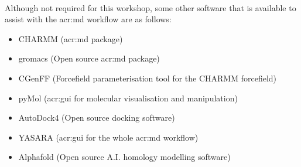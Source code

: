     \paragraph{}
    Although not required for this workshop, some other software that is available to assist with the \gls{acr:md} workflow are as follows:

\begin{itemize}
    \item CHARMM\cite{Brooks1983CHARMM:Calculations} (\gls{acr:md} package)
    \item gromacs\cite{Berendsen1995GROMACS:Implementation} (Open source \gls{acr:md} package)
    \item CGenFF\cite{Vanommeslaeghe2012AutomationTyping} (Forcefield parameterisation tool for the CHARMM forcefield)
    \item pyMol (\gls{acr:gui} for molecular visualisation and manipulation)
    \item AutoDock4\cite{Morris2009AutoDock4Flexibility} (Open source docking software)
    \item YASARA\cite{Krieger2014YASARAWorkstations} (\gls{acr:gui} for the whole \gls{acr:md} workflow)
    \item Alphafold\cite{Jumper2021HighlyAlphaFold, Varadi2022AlphaFoldModels} (Open source A.I. homology modelling software) 
\end{itemize}


